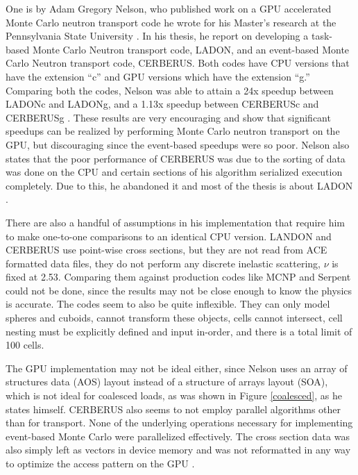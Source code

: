 One is by Adam Gregory Nelson, who published work on a GPU accelerated Monte Carlo neutron transport code he wrote for his Master's research at the Pennsylvania State University \cite{nelson}.  In his thesis, he report on developing a task-based Monte Carlo Neutron transport code, LADON, and an event-based Monte Carlo Neutron transport code, CERBERUS.  Both codes have CPU versions that have the extension ``c'' and GPU versions which have the extension ``g.''  Comparing both the codes, Nelson was able to attain a 24x speedup between LADONc and LADONg, and a 1.13x speedup between CERBERUSc and CERBERUSg .  These results are very encouraging and show that significant speedups can be realized by performing Monte Carlo neutron transport on the GPU, but discouraging since the event-based speedups were so poor.  Nelson also states that the poor performance of CERBERUS was due to the sorting of data was done on the CPU and certain sections of his algorithm serialized execution completely.  Due to this, he abandoned it and most of the thesis is about LADON \cite{nelson}.  

There are also a handful of assumptions in his implementation that require him to make one-to-one comparisons to an identical CPU version.  LANDON and CERBERUS use point-wise cross sections, but they are not read from ACE formatted data files, they do not perform any discrete inelastic scattering,  $\nu$ is fixed at 2.53.  Comparing them against production codes like MCNP and Serpent could not be done, since the results may not be close enough to know the physics is accurate.  The codes seem to also be quite inflexible.  They can only model spheres and cuboids, cannot transform these objects, cells cannot intersect, cell nesting must be explicitly defined and input in-order, and there is a total limit of 100 cells.

The GPU implementation may not be ideal either, since Nelson uses an array of structures data (AOS) layout instead of a structure of arrays layout (SOA), which is not ideal for coalesced loads, as was shown in Figure \ref{coalesced}, as he states himself.  CERBERUS also seems to not employ parallel algorithms other than for transport.  None of the underlying operations necessary for implementing event-based Monte Carlo were parallelized effectively.  The cross section data was also simply left as vectors in device memory and was not reformatted in any way to optimize the access pattern on the GPU \cite{nelson}.

